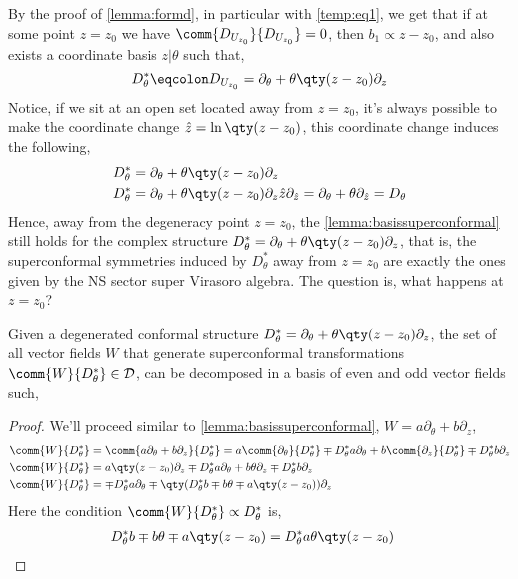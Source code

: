 By the proof of \cref{lemma:formd}, in particular with \cref{temp:eq1}, we get that if at some point $z=z_0$ we have 
$\comm{D_{U_{z_0}}}{D_{U_{z_0}}}=0$, then $b_1\propto z-z_0$, and also exists a coordinate basis $z|\theta$ such that,
\[D^\ast_\theta\eqcolon D_{U_{z_0}}=\partial_\theta+\theta\qty(z-z_0)\partial_z\]
Notice, if we sit at an open set located away from $z=z_0$, it's always possible to make the coordinate change $\hat z=\ln\qty(z-z_0)$, 
this coordinate change induces the following,
\begin{align*}
    D^\ast_\theta&=\partial_\theta+\theta\qty(z-z_0)\partial_z\\
    D^\ast_\theta&=\partial_\theta+\theta\qty(z-z_0)\partial_z\hat z\partial_{\hat z}=\partial_\theta+\theta\partial_{\hat z}=D_\theta
\end{align*}
Hence, away from the degeneracy point $z=z_0$, the \cref{lemma:basissuperconformal} still holds for the complex structure 
$D^\ast_\theta=\partial_\theta+\theta\qty(z-z_0)\partial_z$, that is, the superconformal symmetries induced by $D^\ast_\theta$ 
away from $z=z_0$ are exactly the ones given by the NS sector super Virasoro algebra. The question is, what happens at $z=z_0$? 
\begin{lemma}
    Given a degenerated conformal structure $D^\ast_\theta=\partial_\theta+\theta\qty(z-z_0)\partial_z$, the set of all 
    vector fields $W$ that generate superconformal transformations $\comm{W}{D^\ast_\theta}\in\mathcal D$, 
    can be decomposed in a basis of even and odd vector fields such,
\end{lemma}
\begin{proof}
    We'll proceed similar to \cref{lemma:basissuperconformal}, $W=a\partial_\theta+b\partial_z$,
    \begin{align*}
    \comm{W}{D^\ast_\theta}&=\comm{a\partial_\theta+b\partial_z}{D^\ast_\theta}=a\comm{\partial_\theta}{D^\ast_\theta}\mp D^\ast_\theta a\partial_\theta+b\comm{\partial_z}{D^\ast_\theta}\mp D^\ast_\theta b\partial_z\\
    \comm{W}{D^\ast_\theta}&=a\qty(z-z_0)\partial_z\mp D^\ast_\theta a\partial_\theta+b\theta\partial_z\mp D^\ast_\theta b\partial_z\\
    \comm{W}{D^\ast_\theta}&=\mp D^\ast_\theta a\partial_\theta\mp\qty(D^\ast_\theta b\mp b\theta\mp a\qty(z-z_0))\partial_z
\end{align*}
    Here the condition $\comm{W}{D^\ast_\theta}\propto D^\ast_\theta$ is,
    \begin{align*}
        D^\ast_\theta b\mp b\theta\mp a \qty(z-z_0)&=D^\ast_\theta a\theta\qty(z-z_0)
    \end{align*}
\end{proof}